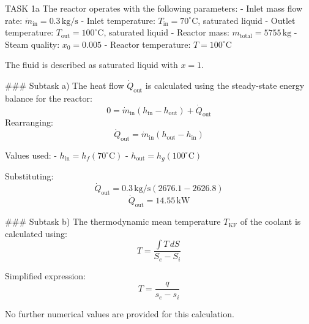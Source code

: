 TASK 1a  
The reactor operates with the following parameters:  
- Inlet mass flow rate: \( \dot{m}_{\text{in}} = 0.3 \, \text{kg/s} \)  
- Inlet temperature: \( T_{\text{in}} = 70^\circ\text{C} \), saturated liquid  
- Outlet temperature: \( T_{\text{out}} = 100^\circ\text{C} \), saturated liquid  
- Reactor mass: \( m_{\text{total}} = 5755 \, \text{kg} \)  
- Steam quality: \( x_0 = 0.005 \)  
- Reactor temperature: \( T = 100^\circ\text{C} \)  

The fluid is described as saturated liquid with \( x = 1 \).  

### Subtask a)  
The heat flow \( \dot{Q}_{\text{out}} \) is calculated using the steady-state energy balance for the reactor:  
\[
0 = \dot{m}_{\text{in}} \left( h_{\text{in}} - h_{\text{out}} \right) + \dot{Q}_{\text{out}}
\]  
Rearranging:  
\[
\dot{Q}_{\text{out}} = \dot{m}_{\text{in}} \left( h_{\text{out}} - h_{\text{in}} \right)
\]  

Values used:  
- \( h_{\text{in}} = h_f(70^\circ\text{C}) \)  
- \( h_{\text{out}} = h_g(100^\circ\text{C}) \)  

Substituting:  
\[
\dot{Q}_{\text{out}} = 0.3 \, \text{kg/s} \left( 2676.1 - 2626.8 \right)
\]  
\[
\dot{Q}_{\text{out}} = 14.55 \, \text{kW}
\]  

### Subtask b)  
The thermodynamic mean temperature \( T_{\text{KF}} \) of the coolant is calculated using:  
\[
T = \frac{\int T \, dS}{S_e - S_i}
\]  

Simplified expression:  
\[
T = \frac{q}{s_e - s_i}
\]  

No further numerical values are provided for this calculation.
